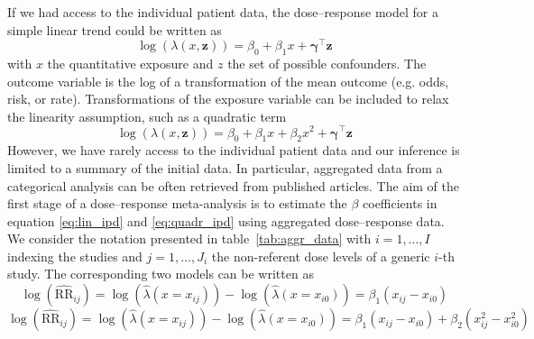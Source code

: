 \documentclass[11pt,a4paper,twoside,openany]{book}\usepackage{knitr}
\begin{document}
{If we had access to the individual patient data, the dose--response model for a simple linear trend could be written as
\begin{equation}
\log \left( \lambda \left(x, \mathbf{z} \right) \right) =  \beta_0 + \beta_1x + \boldsymbol{\gamma}^\top \mathbf{z}
\label{eq:lin_ipd}
\end{equation}
\noindent with $x$ the quantitative exposure and $z$ the set of possible confounders. The outcome variable is the log of a transformation of the mean outcome (e.g. odds, risk, or rate). Transformations of the exposure variable can be included to relax the linearity assumption, such as a quadratic term
\begin{equation}
\log \left( \lambda \left(x, \mathbf{z} \right) \right) =  \beta_0 + \beta_1x + \beta_2x^2 + \boldsymbol{\gamma}^\top \mathbf{z}
\label{eq:quadr_ipd}
\end{equation}
\noindent However, we have rarely access to the individual patient data and our inference is limited to a summary of the initial data. In particular, aggregated data from a categorical analysis can be often retrieved from published articles. 
\noindent The aim of the first stage of a dose--response meta-analysis is to estimate the $\beta$ coefficients in equation \ref{eq:lin_ipd} and \ref{eq:quadr_ipd} using aggregated dose--response data. We consider the notation presented in table~\ref{tab:aggr_data} with $i = 1, \dots, I$ indexing the studies and $j = 1, \dots, J_i$ the non-referent dose levels of a generic $i$-th study. The corresponding two models can be written as
\begin{equation}
\log \left( \widehat{\mathrm{RR}}_{ij} \right) = \log \left( \hat \lambda \left(x = x_{ij} \right) \right) - \log \left( \hat \lambda \left(x = x_{i0} \right) \right) = \beta_1\left(x_{ij} - x_{i0} \right)
\label{eq:lin_ad}
\end{equation}
\begin{equation}
\log \left( \widehat{\mathrm{RR}}_{ij} \right) = \log \left( \hat \lambda \left(x = x_{ij} \right) \right) - \log \left( \hat \lambda \left(x = x_{i0} \right) \right) = \beta_1\left(x_{ij} - x_{i0} \right) + \beta_2\left(x_{ij}^2 - x_{i0}^2 \right)
\label{eq:quadr_ad}
\end{equation}

}
\end{document}
